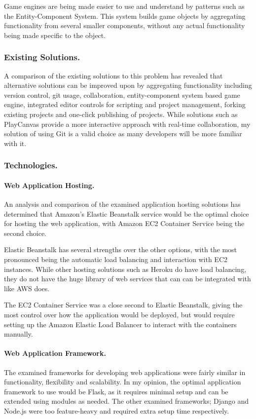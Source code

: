 \documentclass[a4paper, 12pt]{article}
\begin{document}
Game engines are being made easier to use and understand by patterns such as the Entity-Component System. This system builds game objects by aggregating functionality from several smaller components, without any actual functionality being made specific to the object.

\subsubsection{Existing Solutions.}
A comparison of the existing solutions to this problem has revealed that alternative solutions can be improved upon by aggregating functionality including version control, git usage, collaboration, entity-component system based game engine, integrated editor controls for scripting and project management, forking existing projects and one-click publishing of projects. While solutions such as PlayCanvas provide a more interactive approach with real-time collaboration, my solution of using Git is a valid choice as many developers will be more familiar with it.

\subsubsection{Technologies.}
\paragraph{Web Application Hosting.}
An analysis and comparison of the examined application hosting solutions has determined that Amazon's Elastic Beanstalk service would be the optimal choice for hosting the web application, with Amazon EC2 Container Service being the second choice.

Elastic Beanstalk has several strengths over the other options, with the most pronounced being the automatic load balancing and interaction with EC2 instances. While other hosting solutions such as Heroku do have load balancing, they do not have the huge library of web services that can can be integrated with like AWS does.

The EC2 Container Service was a close second to Elastic Beanstalk, giving the most control over how the application would be deployed, but would require setting up the Amazon Elastic Load Balancer to interact with the containers manually.

\paragraph{Web Application Framework.}
The examined frameworks for developing web applications were fairly similar in functionality, flexibility and scalability. In my opinion, the optimal application framework to use would be Flask, as it requires minimal setup and can be extended using modules as needed. The other examined frameworks; Django and Node.js were too feature-heavy and required extra setup time respectively.
\end{document}
